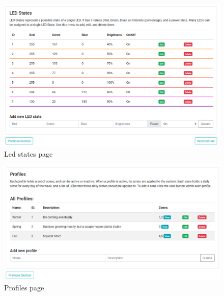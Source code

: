 \documentclass[onecolumn, draftclsnofoot,10pt, compsoc]{IEEEtran}
\begin{document}
	\begin{center}
		\begin{figure}[H]
			\includegraphics[width=\linewidth]{site/led_states.png}
			\caption{Led states page}
			\label{fig:siteLEDStates}
		\end{figure}
	\end{center}
	\begin{center}
		\begin{figure}[H]
			\includegraphics[width=\linewidth]{site/profiles.png}
			\caption{Profiles page}
			\label{fig:siteProfiles}
		\end{figure}
	\end{center}
\end{document}
